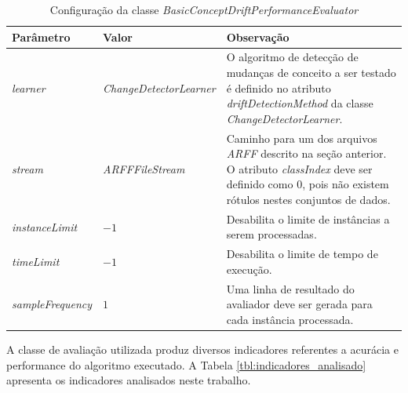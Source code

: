 \documentclass[qual, classic, a4paper]{ufbathesis}
\begin{document}
\begin{center} 
    \begin{table}[ht]
    \caption{Configuração da classe \textit{BasicConceptDriftPerformanceEvaluator}}
    \label{tbl:configuracao_tarefa}
    \begin{tabular}{llm{7.5cm}}
    \hline
    \textbf{Parâmetro} & \textbf{Valor} & \textbf{Observação} \\
    \hline
    \hline
    \textit{learner}          & \textit{ChangeDetectorLearner}  &  O algoritmo de detecção de mudanças de conceito a ser testado é definido no atributo \textit{driftDetectionMethod} da classe \textit{ChangeDetectorLearner}.                   \\
    \addlinespace[1mm]
    \textit{stream}           & \textit{ARFFFileStream}         &  Caminho para um dos arquivos \textit{ARFF} descrito na seção anterior. O atributo \textit{classIndex} deve ser definido como $0$, pois não existem rótulos nestes conjuntos de dados.  \\ 
    \addlinespace[1mm]
    \textit{instanceLimit}    & $-1$                            &  Desabilita o limite de instâncias a serem processadas.  \\
    \addlinespace[1mm]
    \textit{timeLimit}        & $-1$                            &  Desabilita o limite de tempo de execução.  \\ 
    \addlinespace[1mm]
    \textit{sampleFrequency}  & \hspace{3mm}$1$                 &  Uma linha de resultado do avaliador deve ser gerada para cada instância processada.  \\
    \hline
    \end{tabular}
    \end{table}
\end{center}

A classe de avaliação utilizada produz diversos indicadores referentes a acurácia e performance do algoritmo executado. 
A Tabela \ref{tbl:indicadores_analisado} apresenta os indicadores analisados neste trabalho.
\end{document}
